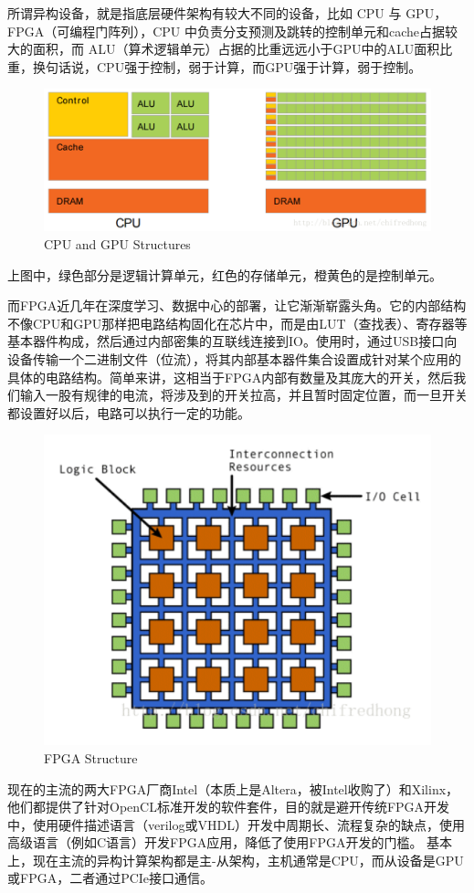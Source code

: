 所谓异构设备，就是指底层硬件架构有较大不同的设备，比如 CPU 与 GPU，FPGA（可编程门阵列），CPU 中负责分支预测及跳转的控制单元和cache占据较大的面积，而 ALU（算术逻辑单元）占据的比重远远小于GPU中的ALU面积比重，换句话说，CPU强于控制，弱于计算，而GPU强于计算，弱于控制。

\begin{figure}[!htbp]
    \centering
    \includegraphics[width=.8\textwidth]{figure/CPU_GPU_structure.png} 
    \caption{CPU and GPU Structures} %
\end{figure}
上图中，绿色部分是逻辑计算单元，红色的存储单元，橙黄色的是控制单元。

而FPGA近几年在深度学习、数据中心的部署，让它渐渐崭露头角。它的内部结构不像CPU和GPU那样把电路结构固化在芯片中，而是由LUT（查找表）、寄存器等基本器件构成，然后通过内部密集的互联线连接到IO。使用时，通过USB接口向设备传输一个二进制文件（位流），将其内部基本器件集合设置成针对某个应用的具体的电路结构。简单来讲，这相当于FPGA内部有数量及其庞大的开关，然后我们输入一股有规律的电流，将涉及到的开关拉高，并且暂时固定位置，而一旦开关都设置好以后，电路可以执行一定的功能。

\begin{figure}[!htbp]
    \centering
    \includegraphics[width=.6\textwidth]{figure/FPGA_structure.png} 
    \caption{FPGA Structure} %
\end{figure}

现在的主流的两大FPGA厂商Intel（本质上是Altera，被Intel收购了）和Xilinx，他们都提供了针对OpenCL标准开发的软件套件，目的就是避开传统FPGA开发中，使用硬件描述语言（verilog或VHDL）开发中周期长、流程复杂的缺点，使用高级语言（例如C语言）开发FPGA应用，降低了使用FPGA开发的门槛。
基本上，现在主流的异构计算架构都是主-从架构，主机通常是CPU，而从设备是GPU或FPGA，二者通过PCIe接口通信。

